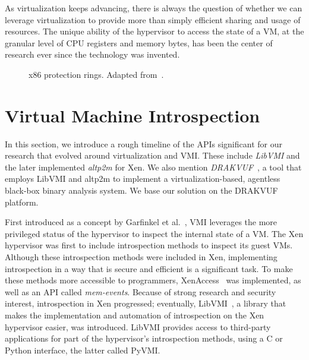 As virtualization keeps advancing, there is always the question of whether we can leverage virtualization to provide more than simply efficient sharing and usage of resources. The unique ability of the hypervisor to access the state of a \ac{VM}, at the granular level of \ac{CPU} registers and memory bytes, has been the center of research ever since the technology was invented. 

\begin{figure}[ht]
	\centering
	
	\caption{x86 protection rings. Adapted from~\cite{rings}.}
	\label{fig:rings}
\end{figure}

\section{Virtual Machine Introspection}\label{sec:vmi}
In this section, we introduce a rough timeline of the \acp{API} significant for our research that evolved around virtualization and \ac{VMI}. These include \emph{LibVMI} and the later implemented \emph{altp2m} for Xen. We also mention \emph{DRAKVUF}~\cite{lengyel2014drakvuf}, a tool that employs LibVMI and altp2m to implement a virtualization-based, agentless black-box binary analysis system. We base our solution on the DRAKVUF platform. 	

\par First introduced as a concept by Garfinkel et al.~\cite{garfinkel2003virtual}, \ac{VMI} leverages the more privileged status of the hypervisor to inspect the internal state of a \ac{VM}. The Xen hypervisor was first to include introspection methods to inspect its guest \ac{VM}s. Although these introspection methods were included in Xen, implementing introspection in a way that is secure and efficient is a significant task. To make these methods more accessible to programmers, XenAccess~\cite{payne2007secure} was implemented, as well as an \ac{API} called \emph{mem-events}. Because of strong research and security interest, introspection in Xen progressed; eventually, LibVMI~\cite{payne2011libvmi}, a library that makes the implementation and automation of introspection on the Xen hypervisor easier, was introduced. LibVMI provides access to third-party applications for part of the hypervisor's introspection methods, using a C or Python interface, the latter called PyVMI. 

